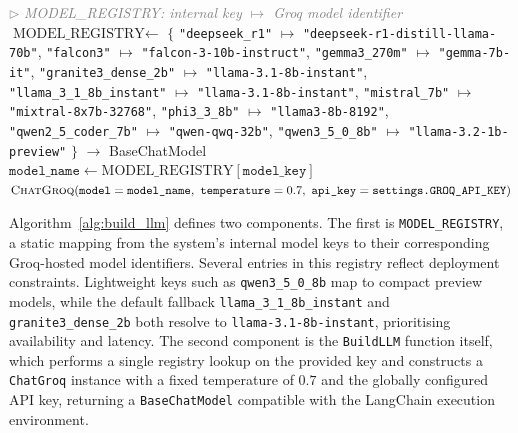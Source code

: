 \documentclass[12pt,a4paper]{article}
\newcommand{\ty}[1]{\texttt{#1}}
\newcommand{\cmt}[1]{\textcolor{gray}{$\triangleright$ \textit{#1}}}
\begin{document}
\begin{algorithm}[H]
\caption{LLM factory function mapping model keys to Groq-hosted model instances.}
\label{alg:build_llm}
\begin{algorithmic}[1]
  \State \cmt{MODEL\_REGISTRY: internal key $\mapsto$ Groq model identifier}
  \State $\text{MODEL\_REGISTRY} \gets$
  \State \hspace{\algorithmicindent}
    $\{$
    \ty{"deepseek\_r1"} $\mapsto$ \ty{"deepseek-r1-distill-llama-70b"},
  \State \hspace{\algorithmicindent}
    \ty{"falcon3"} $\mapsto$ \ty{"falcon-3-10b-instruct"},
  \State \hspace{\algorithmicindent}
    \ty{"gemma3\_270m"} $\mapsto$ \ty{"gemma-7b-it"},
  \State \hspace{\algorithmicindent}
    \ty{"granite3\_dense\_2b"} $\mapsto$ \ty{"llama-3.1-8b-instant"},
  \State \hspace{\algorithmicindent}
    \ty{"llama\_3\_1\_8b\_instant"} $\mapsto$ \ty{"llama-3.1-8b-instant"},
  \State \hspace{\algorithmicindent}
    \ty{"mistral\_7b"} $\mapsto$ \ty{"mixtral-8x7b-32768"},
  \State \hspace{\algorithmicindent}
    \ty{"phi3\_3\_8b"} $\mapsto$ \ty{"llama3-8b-8192"},
  \State \hspace{\algorithmicindent}
    \ty{"qwen2\_5\_coder\_7b"} $\mapsto$ \ty{"qwen-qwq-32b"},
  \State \hspace{\algorithmicindent}
    \ty{"qwen3\_5\_0\_8b"} $\mapsto$ \ty{"llama-3.2-1b-preview"}
    $\}$
\Function{BuildLLM}{\ty{model\_key}: str} $\to$ BaseChatModel
  \State $\ty{model\_name} \gets \text{MODEL\_REGISTRY}\!\left[\ty{model\_key}\right]$
  \State \Return $\Call{ChatGroq}{\ty{model}=\ty{model\_name},\ \ty{temperature}=0.7,\ \ty{api\_key}=\ty{settings.GROQ\_API\_KEY}}$
\EndFunction
\end{algorithmic}
\end{algorithm}

Algorithm~\ref{alg:build_llm} defines two components. The first is \texttt{MODEL\_REGISTRY}, a static mapping from the system's internal model keys to their corresponding Groq-hosted model identifiers. Several entries in this registry reflect deployment constraints. Lightweight keys such as \texttt{qwen3\_5\_0\_8b} map to compact preview models, while the default fallback \texttt{llama\_3\_1\_8b\_instant} and \texttt{granite3\_dense\_2b} both resolve to \texttt{llama-3.1-8b-instant}, prioritising availability and latency. The second component is the \texttt{BuildLLM} function itself, which performs a single registry lookup on the provided key and constructs a \texttt{ChatGroq} instance with a fixed temperature of $0.7$ and the globally configured API key, returning a \texttt{BaseChatModel} compatible with the LangChain execution environment.
\end{document}
